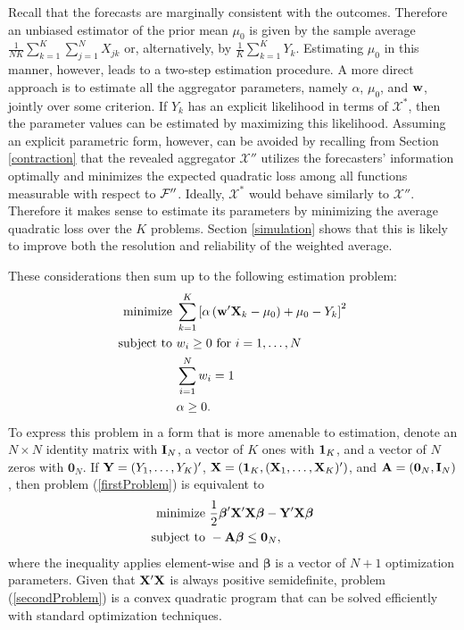 \documentclass[11pt]{article}
\theoremstyle{definition}
\theoremstyle{definition}
\def\one{{\bf 1}}
\def\w{{\bf w}}
\def\A{{\bf A}}
\def\X{{\bf X}}
\def\Y{{\bf Y}}
\def\Beta{\boldsymbol{\beta}}
\def\I{{\bf I}}
\def\F{{\cal F}}
\begin{document}
Recall that the forecasts are marginally consistent with the outcomes. Therefore an unbiased estimator of the prior mean $\mu_0$ is given by the sample average $\frac{1}{NK} \sum_{k=1}^K\sum_{j=1}^N X_{jk}$ or, alternatively, by $\frac{1}{K} \sum_{k=1}^K Y_k$. Estimating $\mu_0$ in this manner, however, leads to a two-step estimation procedure. A more direct approach is to estimate all the aggregator parameters, namely $\alpha$, $\mu_0$, and $\w$, jointly over some criterion. If $Y_k$ has an explicit likelihood in terms of $\mathcal{X}^*$, then the parameter values can be estimated by maximizing this likelihood. Assuming an explicit parametric form, however, can be avoided by recalling from Section \ref{contraction} that the revealed aggregator $\mathcal{X}''$ utilizes the forecasters' information optimally and minimizes the expected quadratic loss among all functions measurable with respect to $\F''$. Ideally, $\mathcal{X}^*$ would behave similarly to $\mathcal{X}''$. Therefore it makes sense to estimate its parameters by minimizing the average quadratic loss over the $K$ problems. Section \ref{simulation} shows that this is likely to improve both the resolution and reliability of the weighted average. 

These considerations then sum up to the following estimation problem:
\begin{align}
 \label{firstProblem}
 \begin{split}
\text{minimize } & \sum_{k=1}^K \left[ \alpha  \left(  \w'\X_{k} - \mu_0\right) + \mu_0 - Y_k \right]^2\\
\text{subject to } & w_i \geq 0 \text{ for } i = 1, \dots, N\\
& \sum_{i=1}^N w_i = 1\\
& \alpha \geq 0.
\end{split}
\end{align}
To express this problem in a form that is more amenable to estimation, denote an $N \times N$ identity matrix with $\I_N$,  a vector of $K$ ones with $\one_K$, and a vector of $N$ zeros with $\boldsymbol{0}_N$. If $\Y = (Y_1, \dots, Y_K)'$, $\X = (\one_K, (\X_1, \dots, \X_K)')$, and $\A = (\boldsymbol{0}_N, \I_N)$, then  problem (\ref{firstProblem}) is equivalent to
\begin{align}
 \label{secondProblem}
 \begin{split}
\text{minimize } & \frac{1}{2} \Beta' \X'\X \Beta - \Y'\X\Beta\\
\text{subject to } & -\A\Beta \leq \boldsymbol{0}_N,
\end{split}
\end{align}
where the inequality applies element-wise and $\Beta$ is a vector of $N+1$ optimization parameters. Given that $\X'\X$ is always positive semidefinite, problem (\ref{secondProblem}) is a convex quadratic program that can be solved efficiently with standard optimization techniques. 
 
\end{document}
